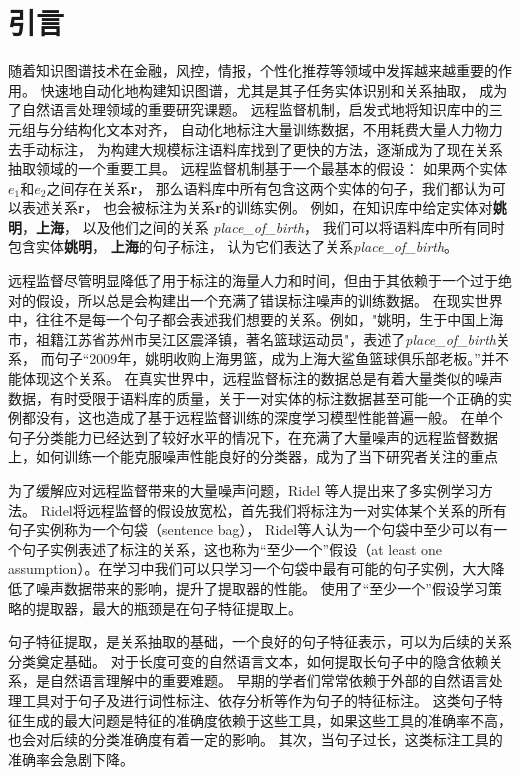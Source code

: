\documentclass[UTF8]{csoarticle}
\begin{document}

\section{引言}
随着知识图谱技术在金融，风控，情报，个性化推荐等领域中发挥越来越重要的作用。
快速地自动化地构建知识图谱，尤其是其子任务实体识别和关系抽取，
成为了自然语言处理领域的重要研究课题。
远程监督机制\cite{bib1}，启发式地将知识库中的三元组与分结构化文本对齐，
自动化地标注大量训练数据，不用耗费大量人力物力去手动标注，
为构建大规模标注语料库找到了更快的方法，逐渐成为了现在关系抽取领域的一个重要工具。
远程监督机制基于一个最基本的假设：
如果两个实体\textbf{$e_1$}和\textbf{$e_2$}之间存在关系\textbf{r}，
那么语料库中所有包含这两个实体的句子，我们都认为可以表述关系\textbf{r}，
也会被标注为关系\textbf{r}的训练实例。
例如，在知识库中给定实体对\textbf{姚明}，\textbf{上海}，
以及他们之间的关系 \textit{place\_of\_birth}，
我们可以将语料库中所有同时包含实体\textbf{姚明}， \textbf{上海}的句子标注，
认为它们表达了关系\textit{place\_of\_birth}。

远程监督尽管明显降低了用于标注的海量人力和时间，但由于其依赖于一个过于绝对的假设，所以总是会构建出一个充满了错误标注噪声的训练数据。
在现实世界中，往往不是每一个句子都会表述我们想要的关系。例如，"姚明，生于中国上海市，祖籍江苏省苏州市吴江区震泽镇，著名篮球运动员"，表述了\textit{place\_of\_birth}关系，
而句子“2009年，姚明收购上海男篮，成为上海大鲨鱼篮球俱乐部老板。”并不能体现这个关系。
在真实世界中，远程监督标注的数据总是有着大量类似的噪声数据，有时受限于语料库的质量，关于一对实体的标注数据甚至可能一个正确的实例都没有，这也造成了基于远程监督训练的深度学习模型性能普遍一般。
在单个句子分类能力已经达到了较好水平的情况下，在充满了大量噪声的远程监督数据上，如何训练一个能克服噪声性能良好的分类器，成为了当下研究者关注的重点


为了缓解应对远程监督带来的大量噪声问题，Ridel\cite{bib2} 等人提出来了多实例学习方法。
Ridel将远程监督的假设放宽松，首先我们将标注为一对实体某个关系的所有句子实例称为一个句袋（sentence bag），
Ridel等人认为一个句袋中至少可以有一个句子实例表述了标注的关系，这也称为“至少一个”假设（at least one assumption）。在学习中我们可以只学习一个句袋中最有可能的句子实例，大大降低了噪声数据带来的影响，提升了提取器的性能。
使用了“至少一个”假设学习策略的提取器，最大的瓶颈是在句子特征提取上。

句子特征提取，是关系抽取的基础，一个良好的句子特征表示，可以为后续的关系分类奠定基础。
对于长度可变的自然语言文本，如何提取长句子中的隐含依赖关系，是自然语言理解中的重要难题。
早期的学者们常常依赖于外部的自然语言处理工具对于句子及进行词性标注、依存分析等作为句子的特征标注。
这类句子特征生成的最大问题是特征的准确度依赖于这些工具，如果这些工具的准确率不高，也会对后续的分类准确度有着一定的影响。
其次，当句子过长，这类标注工具的准确率会急剧下降。
\end{document}

